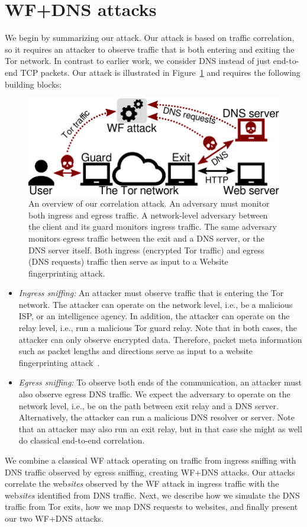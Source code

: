 \section{WF+DNS attacks}
\label{sec:attack}
We begin by summarizing our attack.  Our attack is based on traffic correlation,
so it requires an attacker to observe traffic that is both entering and exiting
the Tor network.  In contrast to earlier work, we consider DNS instead of just
end-to-end TCP packets.
Our attack is illustrated in Figure~\ref{fig:attack-scenario} and requires the
following building blocks:
\begin{figure}[t]
	\centering
	\includegraphics[width=0.8\linewidth]{figures/attack-scenario.pdf}
	\caption{An overview of our correlation attack.  An adversary must monitor
		both ingress and egress traffic.  A network-level adversary between the
		client and its guard monitors ingress traffic.  The same adversary
		monitors egress traffic between the exit and a DNS server, or the DNS
		server itself.  Both ingress (encrypted Tor traffic) and egress (DNS
		requests) traffic then serve as input to a Website fingerprinting
		attack.}
	\label{fig:attack-scenario}
\end{figure}

\begin{itemize}
    \item \emph{Ingress sniffing:} An attacker must observe traffic that is
		entering the Tor network.  The attacker can operate on the network level,
		i.e., be a malicious ISP, or an intelligence agency.  In addition, the
		attacker can operate on the relay level, i.e., run a malicious Tor guard
		relay.  Note that in both cases, the attacker can only observe encrypted
		data.  Therefore, packet meta information such as packet lengths and
		directions serve as input to a website fingerprinting
		attack~\cite{Panchenko2016a}.
    \item \emph{Egress sniffing:} To observe both ends of the communication, an
		attacker must also observe egress DNS traffic.  We expect the adversary
		to operate on the network level, i.e., be on the path between exit relay
		and a DNS server.  Alternatively, the attacker can run a malicious DNS
		resolver or server.  Note that an attacker may also run an exit relay,
		but in that case she might as well do classical end-to-end correlation.
\end{itemize}
We combine a classical WF attack operating on traffic from ingress sniffing with
DNS traffic observed by egress sniffing, creating WF+DNS attacks. Our attacks
correlate the web\emph{sites} observed by the WF attack in ingress traffic with
the web\emph{sites} identified from DNS traffic. Next, we describe how we
simulate the DNS traffic from Tor exits, how we map DNS requests to websites,
and finally present our two WF+DNS attacks.

